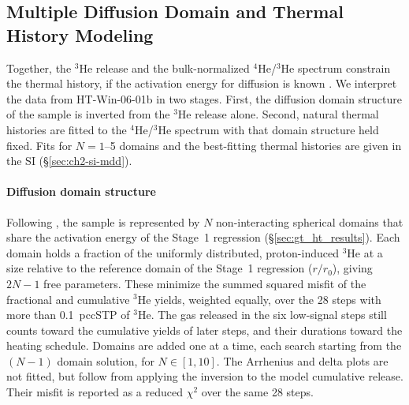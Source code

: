\subsection{Multiple Diffusion Domain and Thermal History Modeling}\label{sec:gt_mdd_methods}

Together, the $^3$He release and the bulk-normalized $^4$He/$^3$He spectrum constrain the thermal history, if the activation energy
for diffusion is known \citep{farleyflowers2012}. We interpret the data from HT-Win-06-01b in two stages. First, the diffusion
domain structure of the sample is inverted from the $^3$He release alone. Second, natural thermal histories are fitted to the
$^4$He/$^3$He spectrum with that domain structure held fixed. Fits for $N=1$--5 domains and the best-fitting thermal histories
are given in the SI (\S\ref{sec:ch2-si-mdd}).

\paragraph{Diffusion domain structure} Following \citet{farleyflowers2012}, the sample is represented by $N$ non-interacting
spherical domains that share the activation energy of the Stage~1 regression (\S\ref{sec:gt_ht_results}). Each domain holds a
fraction of the uniformly distributed, proton-induced $^3$He at a size relative to the reference domain of the Stage~1
regression ($r/r_0$), giving $2N-1$ free parameters. These minimize the summed squared misfit of the fractional and cumulative $^3$He
yields, weighted equally, over the 28 steps with more than 0.1~pccSTP of $^3$He. The gas released in the six low-signal steps
still counts toward the cumulative yields of later steps, and their durations toward the heating schedule. Domains are added
one at a time, each search starting from the $(N-1)$ domain solution, for $N \in [1,10]$. The Arrhenius and delta plots are not 
fitted, but follow from applying the \citet{fechtigkalbitzer1966} inversion to the model cumulative release. 
Their misfit is reported as a reduced $\chi^2$ over the same 28 steps.

